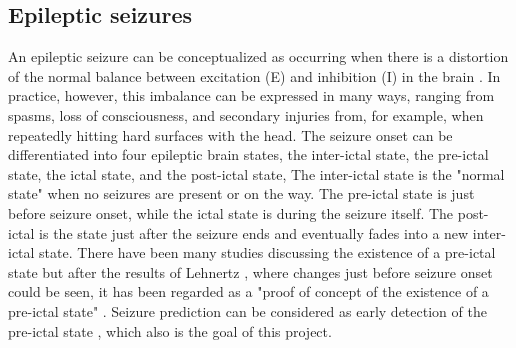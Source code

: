 




%

\subsection{Epileptic seizures}
An epileptic seizure can be conceptualized as occurring when there is a distortion of the normal balance between excitation (E) and inhibition (I) in the brain \cite{seizureEpilepsy}. In practice, however, this imbalance can be expressed in many ways, ranging from spasms, loss of consciousness, and secondary injuries from, for example, when repeatedly hitting hard surfaces with the head. The seizure onset can be differentiated into four epileptic brain states, the inter-ictal state, the pre-ictal state, the ictal state, and the post-ictal state, The inter-ictal state is the "normal state" when no seizures are present or on the way. The pre-ictal state is just before seizure onset, while the ictal state is during the seizure itself. The post-ictal is the state just after the seizure ends and eventually fades into a new inter-ictal state. There have been many studies discussing the existence of a pre-ictal state but after the results of Lehnertz \cite{interictal}, where changes just before seizure onset could be seen, it has been regarded as a "proof of concept of the existence of a pre-ictal state" \cite{seizurePredict}. Seizure prediction can be considered as early detection of the pre-ictal state \cite{acuratePrediction}, which also is the goal of this project.

